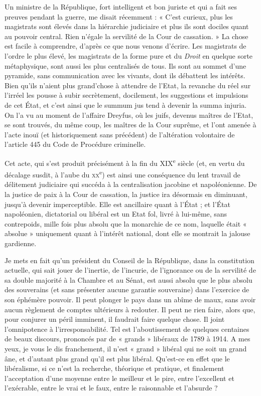\documentclass[french,twoside]{book} %
\begin{document}
Un ministre de la République, fort intelligent et bon juriste et qui a fait ses preuves pendant la guerre, me disait récemment : « C’est curieux, plus les magistrats sont élevés dans la hiérarchie judiciaire et plus ils sont dociles quant au pouvoir central. Rien n’égale la servilité de la Cour de cassation. » La chose est facile à comprendre, d’après ce que nous venons d’écrire. Les magistrats de l’ordre le plus élevé, les magistrats de la forme pure et du {\itshape Droit} en quelque sorte métaphysique, sont aussi les plus centralisés de tous. Ils sont au sommet d’une pyramide, sans communication avec les vivants, dont ils débattent les intérêts. Bien qu’ils n’aient plus grand’chose à attendre de l’Etat, la revanche du réel sur l’irréel les pousse à subir secrètement, docilement, les suggestions et impulsions de cet État, et c’est ainsi que le summum jus tend à devenir la summa injuria. On l’a vu au moment de l’affaire Dreyfus, où les juifs, devenus maîtres de l’Etat, se sont trouvés, du même coup, les maîtres de la Cour suprême, et l’ont amenée à l’acte inouï (et historiquement sans précédent) de l’altération volontaire de l’article 445 du Code de Procédure criminelle.\par
Cet acte, qui s’est produit précisément à la fin du XIX\textsuperscript{e} siècle (et, en vertu du décalage susdit, à l’aube du \textsc{xx}\textsuperscript{e}) est ainsi une conséquence du lent travail de délitement judiciaire qui succéda à la centralisation jacobine et napoléonienne. De la justice de paix à la Cour de cassation, la justice ira désormais en diminuant, jusqu’à devenir imperceptible. Elle est ancillaire quant à l’État ; et l’État napoléonien, dictatorial ou libéral est un Etat fol, livré à lui-même, sans contrepoids, mille fois plus absolu que la monarchie de ce nom, laquelle était « absolue » uniquement quant à l’intérêt national, dont elle se montrait la jalouse gardienne.\par
Je mets en fait qu’un président du Conseil de la République, dans la constitution actuelle, qui sait jouer de l’inertie, de l’incurie, de l’ignorance ou de la servilité de sa double majorité à la Chambre et au Sénat, est aussi absolu que le plus absolu des souverains (et sans présenter aucune garantie souveraine) dans l’exercice de son éphémère pouvoir. Il peut plonger le pays dans un abîme de maux, sans avoir aucun règlement de comptes ultérieurs à redouter. Il peut ne rien faire, alors que, pour conjurer un péril imminent, il faudrait faire quelque chose. Il joint l’omnipotence à l’irresponsabilité. Tel est l’aboutissement de quelques centaines de beaux discours, prononcés par de « grands » libéraux de 1789 à 1914. A mes yeux, je vous le dis franchement, il n’est « grand » libéral qui ne soit un grand âne, et d’autant plus grand qu’il est plus libéral. Qu’est-ce en effet que le libéralisme, si ce n’est la recherche, théorique et pratique, et finalement l’acceptation d’une moyenne entre le meilleur et le pire, entre l’excellent et l’exécrable, entre le vrai et le faux, entre le raisonnable et l’absurde ?\par
\end{document}
